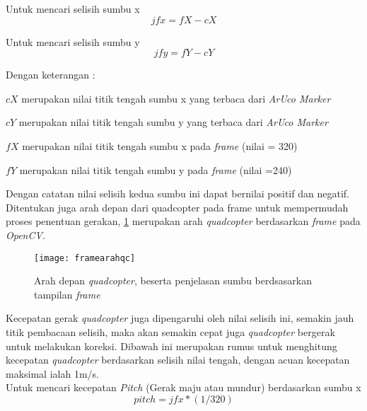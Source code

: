 Untuk mencari selisih sumbu x
\begin{equation}
	jfx = fX - cX
	\label{eq:selsumx}
\end{equation}

Untuk mencari selisih sumbu y
\begin{equation}
	jfy = fY - cY
	\label{eq:selsumy}
\end{equation}

Dengan keterangan :

\begin{packed_item}
	\item \({cX}\) merupakan nilai titik tengah sumbu x yang terbaca dari \textit{ArUco Marker}
	\item \({cY}\) merupakan nilai titik tengah sumbu y yang terbaca dari \textit{ArUco Marker}
	\item \({fX}\) merupakan nilai titik tengah sumbu x pada \textit{frame} (nilai = 320)
	\item \({fY}\) merupakan nilai titik tengah sumbu y pada \textit{frame} (nilai =240)
\end{packed_item}


Dengan catatan nilai selisih kedua sumbu ini dapat bernilai positif dan negatif.\\ 

Ditentukan juga arah depan dari quadcopter pada frame untuk mempermudah proses penentuan gerakan, \cref{fig:framearahqc} merupakan arah \textit{quadcopter} berdasarkan \textit{frame} pada \textit{OpenCV}.

\begin{figure}[H]
	\centering
	\texttt{[image: framearahqc]}
	\caption{Arah depan \textit{quadcopter}, beserta penjelasan sumbu berdsasarkan tampilan \textit{frame}}
	\label{fig:framearahqc}
\end{figure}

Kecepatan gerak \textit{quadcopter} juga dipengaruhi oleh nilai selisih ini, semakin jauh titik pembacaan selisih, maka akan semakin cepat juga \textit{quadcopter} bergerak untuk melakukan koreksi. Dibawah ini merupakan rumus untuk menghitung kecepatan \textit{quadcopter} berdasarkan selisih nilai tengah, dengan acuan kecepatan maksimal ialah 1m/s. \\

Untuk mencari kecepatan \textit{Pitch} (Gerak maju atau mundur) berdasarkan sumbu x
\begin{equation}
	pitch = jfx*(1/320)
\end{equation}

